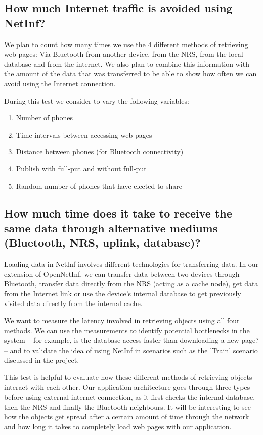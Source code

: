 \documentclass[12pt,a4paper]{article}
\begin{document}
\subsection{How much Internet traffic is avoided using NetInf?}
We plan to count how many times we use the 4 different methods of retrieving web pages: Via Bluetooth from another device, from the NRS, from the local database and from the internet.
We also plan to combine this information with the amount of the data that was transferred to be able to show how often we can avoid using the Internet connection.

During this test we consider to vary the following variables:

\begin{enumerate}
\item Number of phones
\item Time intervals between accessing web pages
\item Distance between phones (for Bluetooth connectivity)
\item Publish with full-put and without full-put
\item Random number of phones that have elected to share
\end{enumerate}

\subsection{How much time does it take to receive the same data through alternative mediums (Bluetooth, NRS, uplink, database)?}

Loading data in NetInf involves different technologies for transferring data. In our extension of OpenNetInf, we can transfer data between two devices through Bluetooth, transfer data directly from the NRS (acting as a cache node), get data from the Internet link or use the device's internal database to get previously visited data directly from the internal cache.

We want to measure the latency involved in retrieving objects using all four methods. We can use the measurements to identify potential bottlenecks in the system -- for example, is the database access faster than downloading a new page? -- and to validate the idea of using NetInf in scenarios such as the 'Train' scenario discussed in the project.

This test is helpful to evaluate how these different methods of retrieving objects interact with each other. Our application architecture goes through three types before using external internet connection, as it first checks the internal database, then the NRS and finally the Bluetooth neighbours. It will be interesting to see how the objects get spread after a certain amount of time through the network and how long it takes to completely load web pages with our application.
\end{document}
